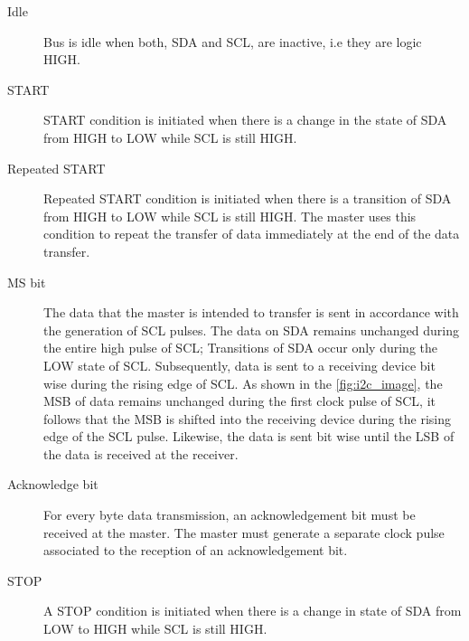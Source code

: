 \begin{description}
	\item[Idle] Bus is idle when both, \Gls{SDA} and \Gls{SCL}, are inactive, i.e they are logic HIGH.
	\item[START] START condition is initiated when there is a change in the state of SDA from HIGH to LOW while SCL is still HIGH.  
	\item[Repeated START] Repeated START condition is initiated when there is a transition of SDA from HIGH to LOW while SCL is still HIGH. 
	The master uses this condition to repeat the transfer of data immediately at the end of the data transfer.
	\item[MS bit] The data that the master is intended to transfer is sent in accordance with the generation of SCL pulses. 
	The data on SDA remains unchanged during the entire high pulse of SCL; Transitions of SDA occur only during the LOW state of SCL. 
	Subsequently, data is sent to a receiving device bit wise during the rising edge of SCL.
	As shown in the \cref{fig:i2c_image}, the \Gls{MSB} of data remains unchanged during the first clock pulse of SCL, it follows that the MSB is shifted into the receiving device during the rising edge of the SCL pulse.  
	Likewise, the data is sent bit wise until the \Gls{LSB} of the data is received at the receiver. 
	\item[Acknowledge bit] For every byte data transmission, an acknowledgement bit must be received at the master.
	The master must generate a separate clock pulse associated to the reception of an acknowledgement bit. 
	\item[STOP] A STOP condition is initiated when there is a change in state of \Gls{SDA} from LOW to HIGH while \Gls{SCL} is still HIGH.
\end{description}

